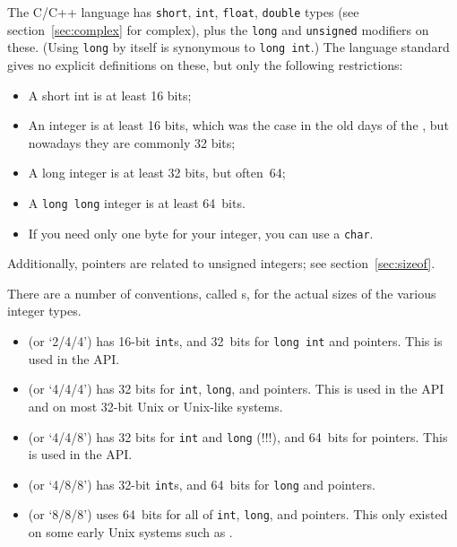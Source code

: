 The C/C++ language has \lstinline{short}, \lstinline{int}, \lstinline{float},
\lstinline{double} types
(see section~\ref{sec:complex} for complex),
plus the \lstinline{long} and \lstinline{unsigned} modifiers on these.
(Using \lstinline{long} by itself is synonymous to \lstinline{long int}.)
%
The language standard gives no explicit definitions on these,
but only the following restrictions:
\begin{itemize}
\item A short int is at least 16 bits;
\item An integer is at least 16 bits, which was the case
  in the old days of the ,
  but nowadays they are commonly 32 bits;
\item A long integer is at least 32 bits, but often~64;
\item A \lstinline{long long} integer is at least 64~bits.
\item If you need only one byte for your integer, you can use a \lstinline{char}.
\end{itemize}
Additionally, pointers are related to unsigned integers;
see section~\ref{sec:sizeof}.


There are a number of conventions, called s,
for the actual sizes of the various integer types.
\begin{itemize}
\item {} (or `2/4/4') has 16-bit \lstinline{int}s,
  and 32~bits for \lstinline{long int} and pointers.
  This is used in the  \acs{API}.
\item {} (or `4/4/4')
  has 32 bits for \lstinline{int}, \lstinline{long}, and pointers.
  This is used in the  \acs{API}
  and on most 32-bit Unix or Unix-like systems.
\item {} (or `4/4/8')
  has 32 bits for \lstinline{int} and \lstinline{long} (!!!),
  and 64~bits for pointers.
  This is used in the  API.
\item {} (or `4/8/8')
  has 32-bit \lstinline{int}s, and 64~bits for \lstinline{long} and pointers.
\item {} (or `8/8/8') uses 64~bits for all of
  \lstinline{int}, \lstinline{long}, and pointers.
  This only existed on some early Unix systems such as
  .
\end{itemize}

